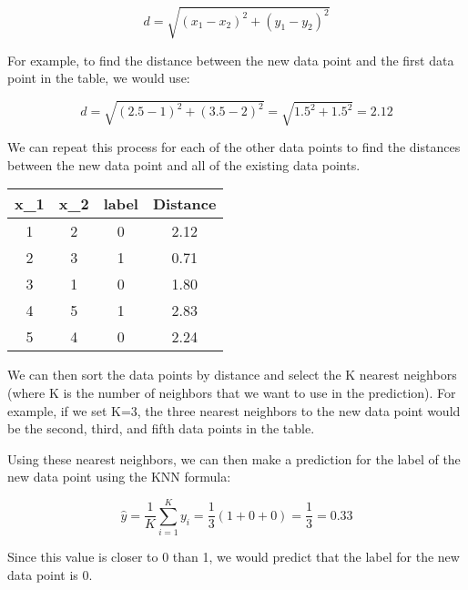 \documentclass{article}
\theoremstyle{mytheoremstyle}
\theoremstyle{mytheoremstyle}
\theoremstyle{myproblemstyle}
\begin{document}
$$ d = \sqrt{(x_1 - x_2)^2 + (y_1 - y_2)^2} $$

For example, to find the distance between the new data point and the first data point in the table, we would use:

$$ d = \sqrt{(2.5 - 1)^2 + (3.5 - 2)^2} = \sqrt{1.5^2 + 1.5^2} = 2.12 $$

We can repeat this process for each of the other data points to find the distances between the new data point and all of the existing data points.

\begin{center}
	\begin{tabular}{ c c c c}
		x_1 & x_2 & label & Distance \\
		\hline
		1   & 2   & 0     & 2.12     \\
		2   & 3   & 1     & 0.71     \\
		3   & 1   & 0     & 1.80     \\
		4   & 5   & 1     & 2.83     \\
		5   & 4   & 0     & 2.24     \\
	\end{tabular}
\end{center}
We can then sort the data points by distance and select the K nearest neighbors (where K is the number of neighbors that we want to use in the prediction). For example, if we set K=3, the three nearest neighbors to the new data point would be the second, third, and fifth data points in the table.

Using these nearest neighbors, we can then make a prediction for the label of the new data point using the KNN formula:

$$ \hat{y} = \frac{1}{K} \sum_{i=1}^K y_i = \frac{1}{3} (1 + 0 + 0) = \frac{1}{3} = 0.33 $$

Since this value is closer to 0 than 1, we would predict that the label for the new data point is 0.


\newpage
\end{document}
